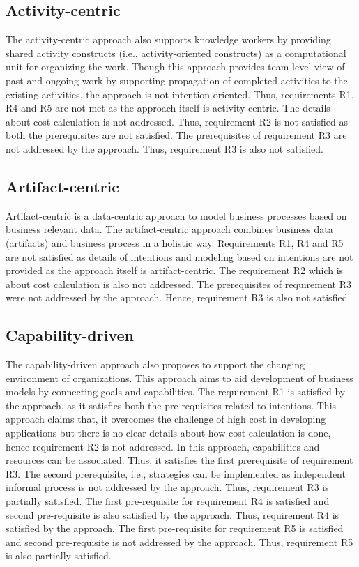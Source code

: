 \subsection{Activity-centric} 
The activity-centric approach also supports knowledge workers by providing shared activity constructs (i.e., activity-oriented constructs) as a computational unit for organizing the work. Though this approach provides team level view of past and ongoing work by supporting propagation of completed activities to the existing activities, the approach is not intention-oriented. Thus, requirements R1, R4 and R5 are not met as the approach itself is activity-centric. The details about cost calculation is not addressed. Thus, requirement R2 is not satisfied as both the prerequisites are not satisfied. The prerequisites of requirement R3 are not addressed by the approach. Thus, requirement R3 is also not satisfied.   
 
\subsection{Artifact-centric} 
Artifact-centric is a data-centric approach to model business processes based on business relevant data. The artifact-centric approach combines business data (artifacts) and business process in a holistic way. Requirements R1, R4 and R5 are not satisfied as details of intentions and modeling based on intentions are not provided as the approach itself is artifact-centric. The requirement R2 which is about cost calculation is also not addressed. The prerequisites of requirement R3 were not addressed by the approach. Hence, requirement R3 is also not satisfied. 

\subsection{Capability-driven} 
The capability-driven approach also proposes to support the changing environment of organizations. This approach aims to aid development of business models by connecting goals and capabilities. The requirement R1 is satisfied by the approach, as it satisfies both the pre-requisites related to intentions. This approach claims that, it overcomes the challenge of high cost in developing applications but there is no clear details about how cost calculation is done, hence requirement R2 is not addressed. In this approach, capabilities and resources can be associated. Thus, it satisfies the first prerequisite of requirement R3. The second prerequisite, i.e., strategies can be implemented as independent informal process is not addressed by the approach. Thus, requirement R3 is partially satisfied. The first pre-requisite for requirement R4 is satisfied and second pre-requisite is also satisfied by the approach. Thus, requirement R4 is satisfied by the approach. The first pre-requisite for requirement R5 is satisfied and second pre-requisite is not addressed by the approach. Thus, requirement R5 is also partially satisfied. 

